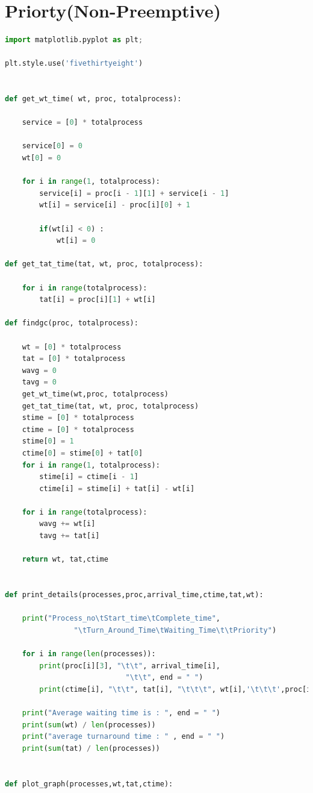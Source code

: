 \documentclass[11pt,a4paper]{report}
\begin{document}
\section{Priorty(Non-Preemptive)}
\begin{lstlisting}[language=Python,caption=SJF Preemptive Source code,breaklines=true,postbreak=\mbox{\textcolor{red}{$\hookrightarrow$}\space},]
import matplotlib.pyplot as plt;

plt.style.use('fivethirtyeight')


def get_wt_time( wt, proc, totalprocess):  
	
	service = [0] * totalprocess
	
	service[0] = 0
	wt[0] = 0
	
	for i in range(1, totalprocess):  
		service[i] = proc[i - 1][1] + service[i - 1]  
		wt[i] = service[i] - proc[i][0] + 1
	
		if(wt[i] < 0) :      
			wt[i] = 0
			
def get_tat_time(tat, wt, proc, totalprocess):  
	
	for i in range(totalprocess): 
		tat[i] = proc[i][1] + wt[i]  
	
def findgc(proc, totalprocess): 
		
	wt = [0] * totalprocess
	tat = [0] * totalprocess
	wavg = 0
	tavg = 0
	get_wt_time(wt,proc, totalprocess)  
	get_tat_time(tat, wt, proc, totalprocess)  
	stime = [0] * totalprocess
	ctime = [0] * totalprocess
	stime[0] = 1
	ctime[0] = stime[0] + tat[0] 
	for i in range(1, totalprocess):  
		stime[i] = ctime[i - 1]  
		ctime[i] = stime[i] + tat[i] - wt[i]  

	for i in range(totalprocess): 
		wavg += wt[i]  
		tavg += tat[i]  

	return wt, tat,ctime


def print_details(processes,proc,arrival_time,ctime,tat,wt):
		
	print("Process_no\tStart_time\tComplete_time", 
				"\tTurn_Around_Time\tWaiting_Time\t\tPriority") 
	
	for i in range(len(processes)):
		print(proc[i][3], "\t\t", arrival_time[i],  
							"\t\t", end = " ") 
		print(ctime[i], "\t\t", tat[i], "\t\t\t", wt[i],'\t\t\t',proc[i][2])  
	
	print("Average waiting time is : ", end = " ") 
	print(sum(wt) / len(processes)) 
	print("average turnaround time : " , end = " ") 
	print(sum(tat) / len(processes)) 
	

def plot_graph(processes,wt,tat,ctime):


\end{lstlisting}
\end{document}
